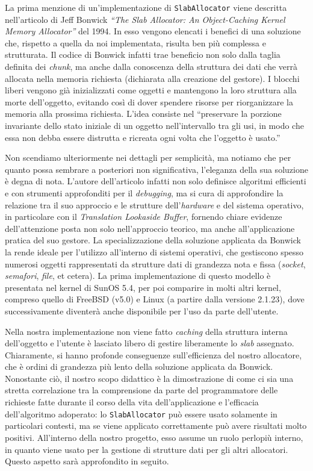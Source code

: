 La prima menzione di un’implementazione di \texttt{SlabAllocator} viene descritta nell’articolo di Jeff Bonwick \textit{“The Slab Allocator: An Object-Caching Kernel Memory Allocator”}\cite{bonwick1994} del 1994. In esso vengono elencati i benefici di una soluzione che, rispetto a quella da noi implementata, risulta ben più complessa e strutturata. Il codice di Bonwick infatti trae beneficio non solo dalla taglia definita dei \textit{chunk}, ma anche dalla conoscenza della struttura dei dati che verrà allocata nella memoria richiesta (dichiarata alla creazione del gestore). I blocchi liberi vengono già inizializzati come oggetti e mantengono la loro struttura alla morte dell'oggetto, evitando così di dover spendere risorse per riorganizzare la memoria alla prossima richiesta. L’idea consiste nel “preservare la porzione invariante dello stato iniziale di un oggetto nell’intervallo tra gli usi, in modo che essa non debba essere distrutta e ricreata ogni volta che l’oggetto è usato.”

Non scendiamo ulteriormente nei dettagli per semplicità, ma notiamo che per quanto possa sembrare a posteriori non significativa, l’eleganza della sua soluzione è degna di nota. L’autore dell’articolo infatti non solo definisce algoritmi efficienti e con strumenti approfonditi per il \textit{debugging}, ma si cura di approfondire la relazione tra il suo approccio e le strutture dell'\textit{hardware} e del sistema operativo, in particolare con il \textit{Translation Lookaside Buffer}, fornendo chiare evidenze dell’attenzione posta non solo nell’approccio teorico, ma anche all’applicazione pratica del suo gestore. La specializzazione della soluzione applicata da Bonwick la rende ideale per l’utilizzo all’interno di sistemi operativi, che gestiscono spesso numerosi oggetti rappresentati da strutture dati di grandezza nota e fissa (\textit{socket}, \textit{semafori}, \textit{file}, et cetera). La prima implementazione di questo modello è presentata nel kernel di SunOS 5.4, per poi comparire in molti altri kernel, compreso quello di FreeBSD (v5.0) e Linux (a partire dalla versione 2.1.23), dove successivamente diventerà anche disponibile per l’uso da parte dell’utente.

Nella nostra implementazione non viene fatto \textit{caching} della struttura interna dell’oggetto e l’utente è lasciato libero di gestire liberamente lo \textit{slab} assegnato. Chiaramente, si hanno profonde conseguenze sull'efficienza del nostro allocatore, che è ordini di grandezza più lento della soluzione applicata da Bonwick. Nonostante ciò, il nostro scopo didattico è la dimostrazione di come ci sia una stretta correlazione tra la comprensione da parte del programmatore delle richieste fatte durante il corso della vita dell’applicazione e l'efficacia dell'algoritmo adoperato: lo \texttt{SlabAllocator} può essere usato solamente in particolari contesti, ma se viene applicato correttamente può avere risultati molto positivi. All'interno della nostro progetto, esso assume un ruolo perlopiù interno, in quanto viene usato per la gestione di strutture dati per gli altri allocatori. Questo aspetto sarà approfondito in seguito.

